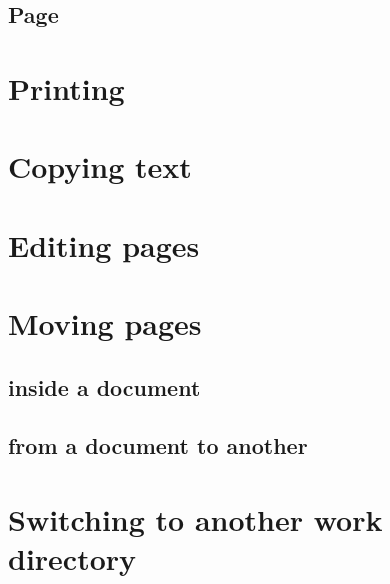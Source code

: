 \documentclass[10pt,a4paper]{article}
\begin{document}
\subsection{Page}

\section{Printing}


\section{Copying text}

\section{Editing pages}


\section{Moving pages}

\subsection{inside a document}

\subsection{from a document to another}

\section{Switching to another work directory}
\end{document}
